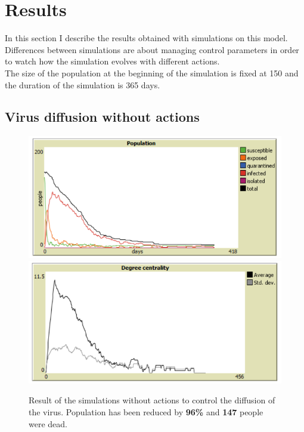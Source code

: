 \documentclass[12pt]{llncs}
\begin{document}
\section{Results}\label{results}
In this section I describe the results obtained with simulations on this model. Differences between simulations are about managing control parameters in order to watch how the simulation evolves with different actions.\\
The size of the population at the beginning of the simulation is fixed at 150 and the duration of the simulation is 365 days.

\subsection{Virus diffusion without actions}

\begin{figure}[H]
	\centering
	\includegraphics[width=\textwidth]{results/no_actions_population.png}
	\includegraphics[width=\textwidth]{results/no_actions_degree_centrality.png}
	\caption{Result of the simulations without actions to control the diffusion of the virus. Population has been reduced by \textbf{96\%} and \textbf{147} people were dead.}
\end{figure}
\end{document}
